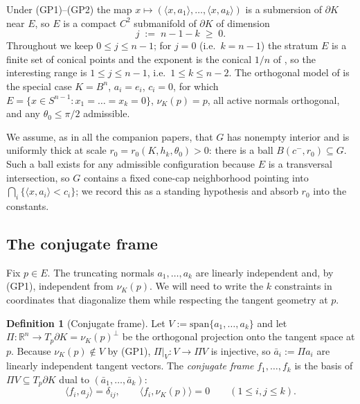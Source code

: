 \documentclass[11pt]{article}
\theoremstyle{definition}
\newtheorem{definition}[theorem]{Definition}
\theoremstyle{remark}
\newcommand{\R}{\mathbb{R}}
\newcommand{\nor}{\nu_K}
\begin{document}
Under (GP1)--(GP2) the map
$x\mapsto(\langle x,a_1\rangle,\dots,\langle x,a_k\rangle)$ is a submersion of
$\partial K$ near $E$, so $E$ is a compact $C^2$ submanifold of $\partial K$
of dimension
\[
j\;:=\;n-1-k\;\ge\;0 .
\]
Throughout we keep $0\le j\le n-1$; for $j=0$ (i.e.\ $k=n-1$) the stratum $E$
is a finite set of conical points and the exponent is the conical $1/n$ of
\cite{companion3,companion5}, so the interesting range is $1\le j\le n-1$,
i.e.\ $1\le k\le n-2$.  The orthogonal model of \cite{companion11} is the
special case $K=B^n$, $a_i=e_i$, $c_i=0$, for which $E=\{x\in S^{n-1}:x_1=\dots
=x_k=0\}$, $\nor(p)=p$, all active normals orthogonal, and any
$\theta_0\le\pi/2$ admissible.

We assume, as in all the companion papers, that $G$ has nonempty interior and
is uniformly thick at scale $r_0=r_0(K,h_k,\theta_0)>0$: there is a ball
$B(c^-,r_0)\subseteq G$.  Such a ball exists for any admissible configuration
because $E$ is a transversal intersection, so $G$ contains a fixed cone-cap
neighborhood pointing into $\bigcap_i\{\langle x,a_i\rangle<c_i\}$; we record
this as a standing hypothesis and absorb $r_0$ into the constants.

\subsection{The conjugate frame}

Fix $p\in E$.  The truncating normals $a_1,\dots,a_k$ are linearly
independent and, by (GP1), independent from $\nor(p)$.  We will need to write
the $k$ constraints in coordinates that diagonalize them while respecting the
tangent geometry at $p$.

\begin{definition}[Conjugate frame]\label{def:conj}
Let $V:=\mathrm{span}\{a_1,\dots,a_k\}$ and let
$\Pi:\R^n\to T_p\partial K=\nor(p)^\perp$ be the orthogonal projection onto the
tangent space at $p$.  Because $\nor(p)\notin V$ by (GP1), $\Pi|_V:V\to\Pi V$
is injective, so $\bar a_i:=\Pi a_i$ are linearly independent tangent vectors.
The \emph{conjugate frame} $f_1,\dots,f_k$ is the basis of $\Pi V\subseteq
T_p\partial K$ dual to $(\bar a_1,\dots,\bar a_k)$:
\[
\langle f_i,a_j\rangle=\delta_{ij},\qquad \langle f_i,\nor(p)\rangle=0
\qquad(1\le i,j\le k).
\]
\end{definition}
\end{document}
